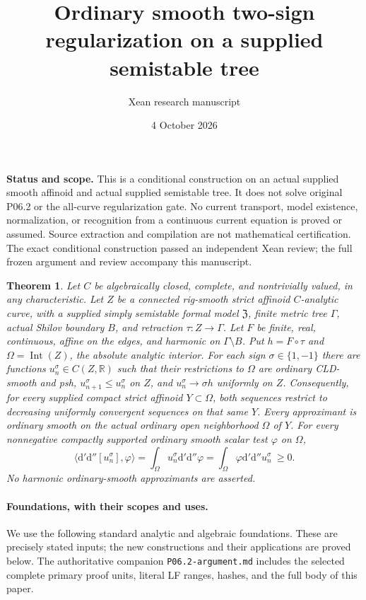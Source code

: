 \documentclass[11pt]{article}
\title{Ordinary smooth two-sign regularization on a supplied semistable tree}
\author{Xean research manuscript}
\date{4 October 2026}
\newtheorem{theorem}{Theorem}
\newcommand{\ddc}{\mathrm{d}'\mathrm{d}''}
\newcommand{\Int}{\operatorname{Int}}
\begin{document}
\maketitle

\noindent\textbf{Status and scope.}
This is a conditional construction on an actual supplied smooth affinoid
and actual supplied semistable tree. It does not solve original P06.2 or
the all-curve regularization gate. No current transport, model existence,
normalization, or recognition from a continuous current equation is proved
or assumed. Source extraction and compilation are not mathematical
certification. The exact conditional construction passed an independent Xean review;
the full frozen argument and review accompany this manuscript.

\begin{theorem}\label{thm:main}
Let $C$ be algebraically closed, complete, and nontrivially valued, in any
characteristic. Let $Z$ be a connected rig-smooth strict affinoid
$C$-analytic curve, with a supplied simply semistable formal model
$\mathfrak Z$, finite metric tree $\Gamma$, actual Shilov boundary $B$,
and retraction $\tau:Z\to\Gamma$. Let $F$ be finite, real, continuous,
affine on the edges, and harmonic on $\Gamma\setminus B$.
Put $h=F\circ\tau$ and $\Omega=\Int(Z)$, the absolute analytic interior.
For each sign $\sigma\in\{1,-1\}$ there are functions
$u_n^\sigma\in C(Z,\mathbb{R})$ such that their restrictions to $\Omega$
are ordinary CLD-smooth and psh, $u_{n+1}^\sigma\leq u_n^\sigma$ on $Z$,
and $u_n^\sigma\to\sigma h$ uniformly on $Z$.
Consequently, for every supplied compact strict affinoid
$Y\subset\Omega$, both sequences restrict to decreasing uniformly
convergent sequences on that same $Y$. Every approximant is ordinary
smooth on the actual ordinary open neighborhood $\Omega$ of $Y$.
For every nonnegative compactly supported ordinary smooth scalar test
$\varphi$ on $\Omega$,
\[
 \langle\ddc[u_n^\sigma],\varphi\rangle
 =\int_\Omega u_n^\sigma\ddc\varphi
 =\int_\Omega\varphi\ddc u_n^\sigma\ \geq 0.
\]
No harmonic ordinary-smooth approximants are asserted.
\end{theorem}

\paragraph{Foundations, with their scopes and uses.}
We use the following standard analytic and algebraic foundations.
These are precisely stated inputs; the new constructions and their
applications are proved below. The authoritative companion
\texttt{P06.2-argument.md} includes the selected complete primary proof
units, literal LF ranges, hashes, and the full body of this paper.
\end{document}
